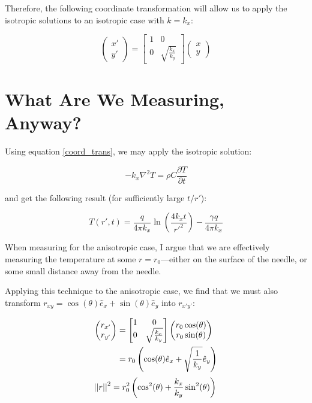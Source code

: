 Therefore, the following coordinate transformation will allow us to apply the
isotropic solutions to an isotropic case with \(k = k_x\):

\begin{equation}
    \label{coord_trans}
    \begin{pmatrix}x' \\ y'\end{pmatrix} =
    \begin{bmatrix}1 & 0\\ 0 & \sqrt{\frac{k_x}{k_y}} \end{bmatrix}\begin{pmatrix}x \\ y\end{pmatrix}
\end{equation}

\section{What Are We Measuring, Anyway?}

Using equation \ref{coord_trans}, we may apply the isotropic solution:

\begin{equation}
    -k_x \nabla^2 T = \rho C\frac{\partial T}{\partial t}
\end{equation}

and get the following result (for sufficiently large \(t/r'\)):

\begin{equation}
T(r',t) = \frac{q}{4\pi k_x}\ln\left(\frac{4k_xt}{r'^2}\right) - \frac{\gamma q}{4\pi k_x}
\end{equation}

When measuring for the anisotropic case, I argue that we are effectively measuring the temperature at some \(r = r_{\textrm{0}}\)---either on the surface of the needle, or some small distance away from the needle.

Applying this technique to the anisotropic case, we find that we must also transform \(r_{xy} = \cos(\theta) \hat{e}_x + \sin(\theta) \hat{e}_y \) into \(r_{x'y'}\):

\begin{align*}
    \begin{pmatrix}r_{x'} \\ r_{y'}\end{pmatrix} &=
    \begin{bmatrix}1 & 0\\ 0 & \sqrt{\frac{k_x}{k_y}} \end{bmatrix}\begin{pmatrix}r_0\cos(\theta) \\ r_0\sin(\theta)\end{pmatrix}\\
    &= r_0\left(\cos(\theta) \hat{e}_x + \sqrt{\frac1{k_y}} \hat{e}_y \right)\\
\end{align*}
\begin{equation}
    \left|\left|{r}\right|\right|^2 = r_0^2 \left(\cos^2(\theta) + \frac{k_x}{k_y}\sin^2(\theta) \right)\\
\end{equation}

